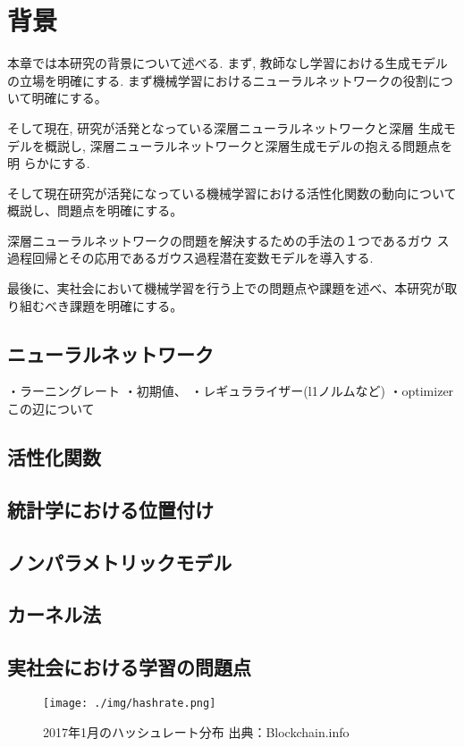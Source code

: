 \chapter{背景}
\label{background}

本章では本研究の背景について述べる.
まず, 教師なし学習における生成モデルの立場を明確にする.
まず機械学習におけるニューラルネットワークの役割について明確にする。

そして現在, 研究が活発となっている深層ニューラルネットワークと深層
生成モデルを概説し, 深層ニューラルネットワークと深層生成モデルの抱える問題点を明
らかにする.

そして現在研究が活発になっている機械学習における活性化関数の動向について概説し、問題点を明確にする。




 深層ニューラルネットワークの問題を解決するための手法の１つであるガウ
ス過程回帰とその応用であるガウス過程潜在変数モデルを導入する.

最後に、実社会において機械学習を行う上での問題点や課題を述べ、本研究が取り組むべき課題を明確にする。



\section{ニューラルネットワーク}
・ラーニングレート
・初期値、
・レギュラライザー(l1ノルムなど)
・optimizer
この辺について
\section{活性化関数}
\section{統計学における位置付け}
\section{ノンパラメトリックモデル}
\section{カーネル法}
\section{実社会における学習の問題点}


\begin{figure}[h]
    \begin{center}
        \texttt{[image: ./img/hashrate.png]}
        \caption{2017年1月のハッシュレート分布 出典：Blockchain.info\cite{bitcoinhashrate}}
        \label{img:hashrate}
    \end{center}
\end{figure}
\fi
